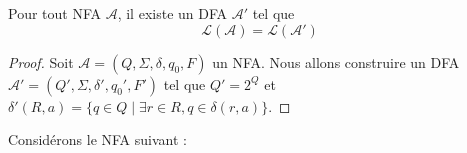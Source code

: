 \begin{theoreme}
Pour tout NFA $\mathcal{A}$, il existe un DFA $\mathcal{A}'$ tel que
    $$\mathcal{L}(\mathcal{A}) = \mathcal{L}(\mathcal{A}')$$
\end{theoreme}

\begin{proof}
    Soit $\mathcal{A} = (Q, \Sigma, \delta, q_0, F)$ un NFA. Nous allons construire un DFA $\mathcal{A}' = (Q', \Sigma, \delta', q_0', F')$ tel que $Q' = 2^Q$ et $\delta'(R,a) = \{q \in Q \mid \exists r \in R, q \in \delta(r,a)\}$. 
\end{proof}


\begin{exemple}

    Considérons le NFA suivant :
\begin{center}



\begin{tikzpicture}[x=0.75pt,y=0.75pt,yscale=-1,xscale=1]


\end{tikzpicture}
\end{center}
\end{exemple}
